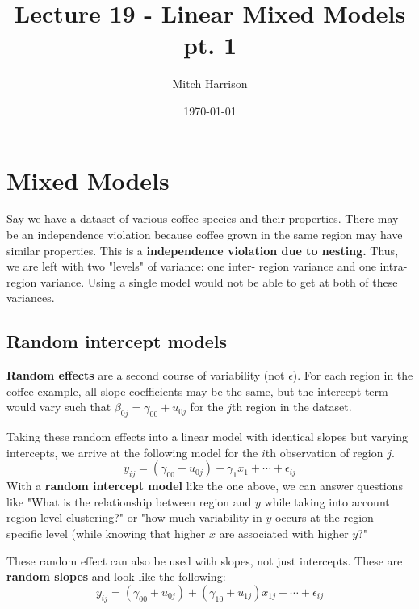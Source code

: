\documentclass[titlepage, 12pt, leqno]{article}
\title{\Huge{Lecture 19 - Linear Mixed Models pt. 1}}
\author{\large{Mitch Harrison}}
\date{\today}
\begin{document}
\setlength{\parskip}{1\baselineskip}
\setlength{\parindent}{15pt}
\maketitle
\tableofcontents
\newpage


\section{Mixed Models}

Say we have a dataset of various coffee species and their properties. There may
be an independence violation because coffee grown in the same region may have
similar properties. This is a \textbf{independence violation due to nesting.} 
Thus, we are left with two "levels" of variance: one inter-
region variance and one intra-region variance. Using a single model would not be
able to get at both of these variances.

\subsection{Random intercept models}
\begin{definition}
    \textbf{Random effects} are a second course of variability (not $\epsilon$).
    For each region in the coffee example, all slope coefficients may be the same,
    but the intercept term would vary such that $\beta_{0j} = \gamma_{00} + 
    u_{0j}$ for the $j$th region in the dataset.
\end{definition}

Taking these random effects into a linear model with identical slopes but varying
intercepts, we arrive at the following model for the $i$th observation of region
$j$.
\[
    y_{ij} = (\gamma_{00} + u_{0j}) + \gamma_1x_1 + \cdots + \epsilon_{ij}
\]
With a \textbf{random intercept model} like the one above, we can answer questions
like "What is the relationship between region and $y$ while taking into account
region-level clustering?" or "how much variability in $y$ occurs at the region-
specific level (while knowing that higher $x$ are associated with higher $y$?"

These random effect can also be used with slopes, not just intercepts. These are
\textbf{random slopes} and look like the following:
\[
    y_{ij} = (\gamma_{00} + u_{0j}) + (\gamma_{10} + u_{1j})x_{1j} + 
    \cdots + \epsilon_{ij}
\]
\end{document}

